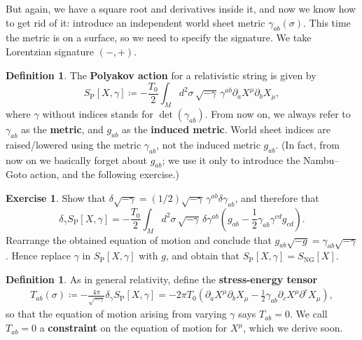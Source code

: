 \documentclass{report}
\theoremstyle{plain}
\theoremstyle{definition}
\newtheorem{definition}[theorem]{Definition}
\newtheorem{exercise}{Exercise}[section]
\theoremstyle{remark}
\newcommand{\di}{\partial}
\begin{document}
But again, we have a square root and derivatives inside it, and now we
know how to get rid of it: introduce an independent world sheet metric
$\gamma_{ab}(\sigma)$. This time the metric is on a surface, so
we need to specify the signature. We take Lorentzian signature $(-,
+)$.

\begin{definition}
  The {\bf Polyakov action} for a relativistic string is given by
  \[ S_{\text{P}}[X, \gamma] \coloneqq -\frac{T_0}{2} \int_M d^2\sigma \, \sqrt{-\gamma} \, \gamma^{ab} \di_a X^\mu \di_b X_\mu, \]
  where $\gamma$ without indices stands for $\det(\gamma_{ab})$. From
  now on, we always refer to $\gamma_{ab}$ as the {\bf metric}, and
  $g_{ab}$ as the {\bf induced metric}. World sheet indices are
  raised/lowered using the metric $\gamma_{ab}$, not the induced
  metric $g_{ab}$. (In fact, from now on we basically forget about
  $g_{ab}$; we use it only to introduce the Nambu--Goto action, and
  the following exercise.)
\end{definition}

\begin{exercise}
  Show that $\delta \sqrt{-\gamma} = (1/2)\sqrt{-\gamma} \,
  \gamma^{ab} \delta \gamma_{ab}$, and therefore that
  \[ \delta_\gamma S_{\text{P}}[X, \gamma] = -\frac{T_0}{2} \int_M d^2\sigma \, \sqrt{-\gamma} \, \delta \gamma^{ab} \left(g_{ab} - \frac{1}{2} \gamma_{ab} \gamma^{cd} g_{cd}\right). \]
  Rearrange the obtained equation of motion and conclude that
  $g_{ab}\sqrt{-g} = \gamma_{ab}\sqrt{-\gamma}$. Hence replace
  $\gamma$ in $S_{\text{P}}[X, \gamma]$ with $g$, and obtain that
  $S_{\text{P}}[X, \gamma] = S_{\text{NG}}[X]$.
\end{exercise}

\begin{definition}
  As in general relativity, define the {\bf stress-energy tensor}
  \begin{align}
      \label{stressenergydefn}
      T_{ab}(\sigma) \coloneqq -\frac{4\pi}{\sqrt{-\gamma}} \delta_{\gamma}
      S_{\text{P}}[X, \gamma] = -2\pi T_0 \left(\di_a X^\mu \di_b X_\mu -
      \frac{1}{2} \gamma_{ab} \di_c X^\mu \di^c X_\mu\right),\end{align}
  so that the equation of motion arising from varying $\gamma$ says
  $T_{ab} = 0$. We call $T_{ab} = 0$ a {\bf constraint} on the
  equation of motion for $X^\mu$, which we derive soon.
\end{definition}
\end{document}
